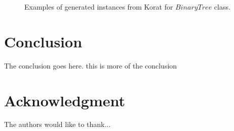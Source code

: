 \documentclass[10pt, conference, compsocconf]{IEEEtran}
\begin{document}
\begin{figure}[!ht]
\centerline{
}
\caption{Examples of generated instances from Korat for $BinaryTree$ class.}
\label{fig:insts}
\end{figure}

\section{Conclusion}
The conclusion goes here. this is more of the conclusion

\section*{Acknowledgment}
The authors would like to thank...



%
\end{document}
